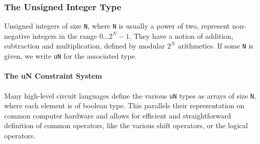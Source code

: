 \subsubsection{The Unsigned Integer Type} Unsigned integers of size \texttt{N}, where \texttt{N} is usually a power of two, represent non-negative integers in the range $0\ldots 2^N-1$. They have a notion of addition, subtraction and multiplication, defined by modular $2^N$ arithmetics. If some \texttt{N} is given, we write \texttt{uN} for the associated type.

\paragraph{The uN Constraint System} Many high-level circuit languages define the various \texttt{uN} types as arrays of size \texttt{N}, where each element is of boolean type. This parallels their representation on common computer hardware and allows for efficient and straightforward definition of common operators, like the various shift operators, or the logical operators.

